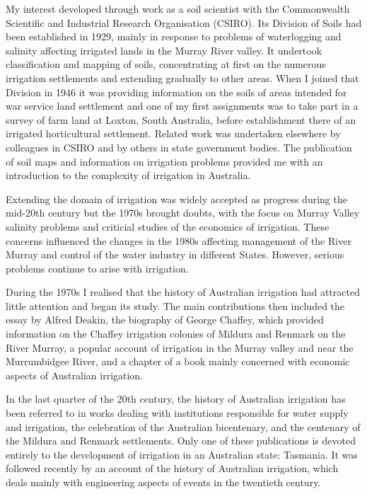 My interest developed through work as a soil scientist with the
Commonwealth Scientific and Industrial Research Organisation (CSIRO).
Its Division of Soils had been established in 1929, mainly in response
to problems of waterlogging and salinity affecting irrigated lands in
the Murray River valley.  It undertook classification and mapping of
soils, concentrating at first on the numerous irrigation settlements
and extending gradually to other areas.  When I joined that Division
in 1946 it was providing information on the soils of areas intended
for war service land settlement and one of my first assignments was to
take part in a survey of farm land at Loxton, South Australia, before
establishment there of an irrigated horticultural settlement.  Related
work was undertaken elsewhere by colleagues in CSIRO and by others in
state government bodies.  The publication of soil maps and information
on irrigation problems provided me with an introduction to the
complexity of irrigation in Australia.

Extending the domain of irrigation was widely accepted as progress
during the mid-20th century but the 1970s brought doubts, with the
focus on Murray Valley salinity problems and criticial studies of the
economics of irrigation.  These concerns influenced the changes in the
1980s affecting management of the River Murray and control of the
water industry in different States.  However, serious problems continue
to arise with irrigation.

During the 1970s I realised that the history of Australian irrigation
had attracted little attention and began its study.  The main
contributions then included the essay by Alfred Deakin, the biography
of George Chaffey, which provided information on the Chaffey
irrigation colonies of Mildura and Renmark on the River Murray, a
popular account of irrigation in the Murray valley and near the
Murrumbidgee River, and a chapter of a book mainly concerned with
economic aspects of Australian irrigation.

In the last quarter of the 20th century, the history of Australian
irrigation has been referred to in works dealing with institutions
responsible for water supply and irrigation, the celebration of the
Australian bicentenary, and the centenary of the Mildura and Renmark
settlements.  Only one of these publications is devoted entirely to
the development of irrigation in an Australian state: Tasmania.  It
was followed recently by an account of the history of Australian
irrigation, which deals mainly with engineering aspects of events in
the twentieth century.

